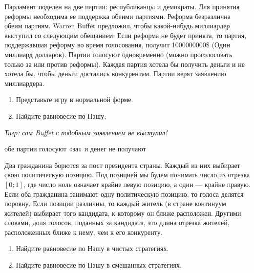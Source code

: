 \begin{problem}
\begin{source}
\cite[p.50]{miller:gtw}
\end{source}
Парламент поделен на две партии: республиканцы и демократы. Для принятия реформы необходима ее поддержка обеими партиями. Реформа безразлична обеим партиям. Warren Buffet предложил, чтобы какой-нибудь миллиардер выступил со следующим обещанием: Если реформа не будет принята, то партия, поддержавшая реформу во время голосования, получит 1000000000\$ (Один миллиард долларов). Партии голосуют одновременно (можно проголосовать только за или против реформы). Каждая партия хотела бы получить деньги и не хотела бы, чтобы деньги достались конкурентам. Партии верят заявлению миллиардера.\par
\begin{enumerate}
\item  Представьте игру в нормальной форме.\par
\item Найдите равновесие по Нэшу;\par
\end{enumerate}
{\it Тигр: сам Buffet  с подобным заявлением не выступил!}




\begin{sol}
обе партии голосуют «за» и денег не получают
\end{sol}
\end{problem}





\begin{problem}
Два гражданина борются за пост президента страны. Каждый из них выбирает свою политическую позицию. Под позицией мы будем понимать число из отрезка  $\left[0;1\right]$, где число ноль означает крайне левую позицию, а один — крайне правую. Если оба гражданина занимают одну политическую позицию, то голоса делятся поровну. Если позиции различны, то каждый житель (в стране континуум жителей) выбирает того кандидата, к которому он ближе расположен. Другими словами, доля голосов, поданных за кандидата, это длина отрезка жителей, расположенных ближе к нему, чем к его конкуренту.
\begin{enumerate}
\item 	Найдите равновесие по Нэшу в чистых стратегиях.

\item 	Найдите равновесие по Нэшу в смешанных стратегиях.
\end{enumerate}


\begin{sol}

\end{sol}
\end{problem}



